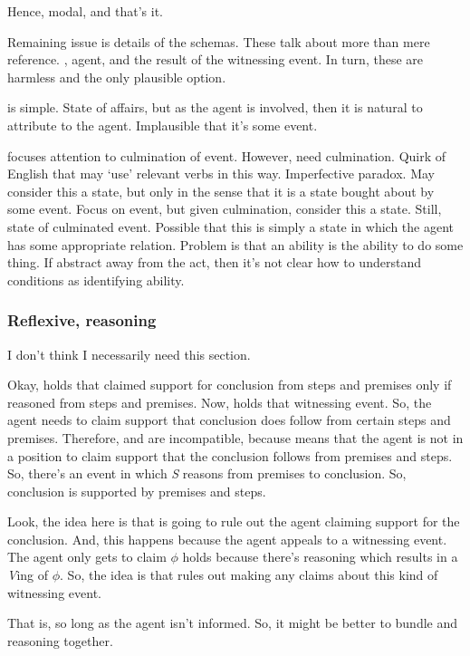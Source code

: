 \begin{note}
  Hence, modal, and that's it.

  Remaining issue is details of the schemas.
  These talk about more than mere reference.
  \AR{}, agent, and \WR{} the result of the witnessing event.
  In turn, these are harmless and the only plausible option.

  \AR{} is simple.
  State of affairs, but as the agent is involved, then it is natural to attribute to the agent.
  Implausible that it's some event.

  \WR{} focuses attention to culmination of event.
  However, need culmination.
  Quirk of English that may `use' relevant verbs in this way.
  Imperfective paradox.
  May consider this a state, but only in the sense that it is a state bought about by some event.
  Focus on event, but given culmination, consider this a state.
  Still, state of culminated event.
  Possible that this is simply a state in which the agent has some appropriate relation.
  Problem is that an ability is the ability to do some thing.
  If abstract away from the act, then it's not clear how to understand conditions as identifying ability.
\end{note}

\subsubsection{Reflexive, reasoning}
\label{sec:reflexive}

{
  \color{green}
  I don't think I necessarily need this section.
}

{
  \color{red}
  Okay, \ESU{} holds that claimed support for conclusion from steps and premises only if reasoned from steps and premises.
  Now, \WR{} holds that witnessing event.
  So, the agent needs to claim support that conclusion does follow from certain steps and premises.
  Therefore, \ESU{} and \WR{} are incompatible, because \ESU{} means that the agent is not in a position to claim support that the conclusion follows from premises and steps.
  So, there's an event in which \emph{S} reasons from premises to conclusion.
  So, conclusion is supported by premises and steps.


  Look, the idea here is that \ESU{} is going to rule out the agent claiming support for the conclusion.
  And, this happens because the agent appeals to a witnessing event.
  The agent only gets to claim \(\phi\) holds because there's reasoning which results in a \emph{V}ing of \(\phi\).
  So, the idea is that \ESU{} rules out making any claims about this kind of witnessing event.

  That is, so long as the agent isn't informed.
  So, it might be better to bundle \gsi{} and reasoning together.
}


